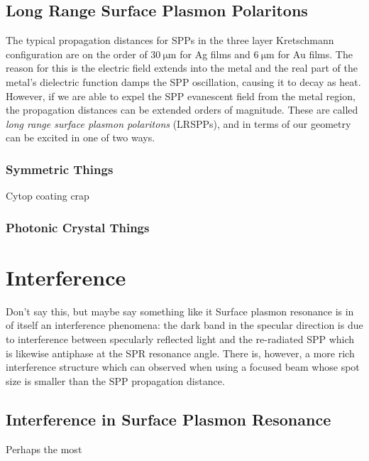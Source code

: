 \documentclass[a4paper,titlepage,onecolumn]{report}
\begin{document}
\section{Long Range Surface Plasmon Polaritons}
The typical propagation distances for SPPs in the three layer Kretschmann configuration are on the order of $\SI{30}{\micro\meter}$ for Ag films and $\SI{6}{\micro\meter}$ for Au films.  The reason for this is the electric field extends into the metal and the real part of the metal's dielectric function damps the SPP oscillation, causing it to decay as heat.  However, if we are able to expel the SPP evanescent field from the metal region, the propagation distances can be extended orders of magnitude.  These are called \textit{long range surface plasmon polaritons} (LRSPPs), and in terms of our geometry can be excited in one of two ways.
\subsection{Symmetric Things}
Cytop coating crap
\subsection{Photonic Crystal Things}

\chapter{Interference}
Don't say this, but maybe say something like it
Surface plasmon resonance is in of itself an interference phenomena: the dark band in the specular direction is due to interference between
specularly reflected light and the re-radiated SPP which is likewise
antiphase at the SPR resonance angle.  There is, however, a more rich 
interference structure which can observed when using a focused beam whose spot size is smaller than the SPP propagation distance.  

\section{Interference in Surface Plasmon Resonance}
Perhaps the most 
\end{document}
